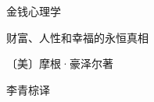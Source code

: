 \thispagestyle{empty}
\vspace*{3em}
\begin{center}
  {\xbsong{}金钱心理学 \par}
  \vspace{1.5em}
  {\heiti {} 财富、人性和幸福的永恒真相 \par}
  \vspace{4em}
  {\kaishu 〔美〕摩根·豪泽尔\q 著\par}
  \vspace{0.8em}
  {\kaishu 李青棕\q 译\par}
\end{center}
\cleardoublepage
